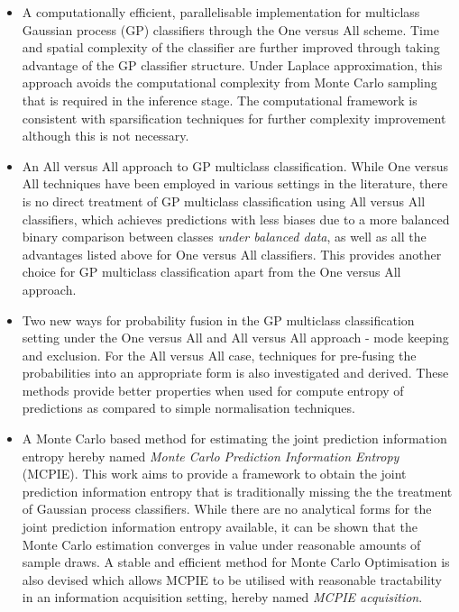 		\begin{itemize}
		
			\item A computationally efficient, parallelisable implementation for multiclass Gaussian process (GP) classifiers through the One versus All scheme. Time and spatial complexity of the classifier are further improved through taking advantage of the GP classifier structure. Under Laplace approximation, this approach avoids the computational complexity from Monte Carlo sampling that is required in the inference stage. The computational framework is consistent with sparsification techniques for further complexity improvement although this is not necessary.
			
			\item An All versus All approach to GP multiclass classification. While One versus All techniques have been employed in various settings in the literature, there is no direct treatment of GP multiclass classification using All versus All classifiers, which achieves predictions with less biases due to a more balanced binary comparison between classes \textit{under balanced data}, as well as all the advantages listed above for One versus All classifiers. This provides another choice for GP multiclass classification apart from the One versus All approach.

			\item Two new ways for probability fusion in the GP multiclass classification setting under the One versus All and All versus All approach - mode keeping and exclusion. For the All versus All case, techniques for pre-fusing the probabilities into an appropriate form is also investigated and derived. These methods provide better properties when used for compute entropy of predictions as compared to simple normalisation techniques.
			
			\item A Monte Carlo based method for estimating the joint prediction information entropy hereby named \textit{Monte Carlo Prediction Information Entropy} (MCPIE). This work aims to provide a framework to obtain the joint prediction information entropy that is traditionally missing the the treatment of Gaussian process classifiers. While there are no analytical forms for the joint prediction information entropy available, it can be shown that the Monte Carlo estimation converges in value under reasonable amounts of sample draws. A stable and efficient method for Monte Carlo Optimisation is also devised which allows MCPIE to be utilised with reasonable tractability in an information acquisition setting, hereby named \textit{MCPIE acquisition}.
			

\end{itemize}

